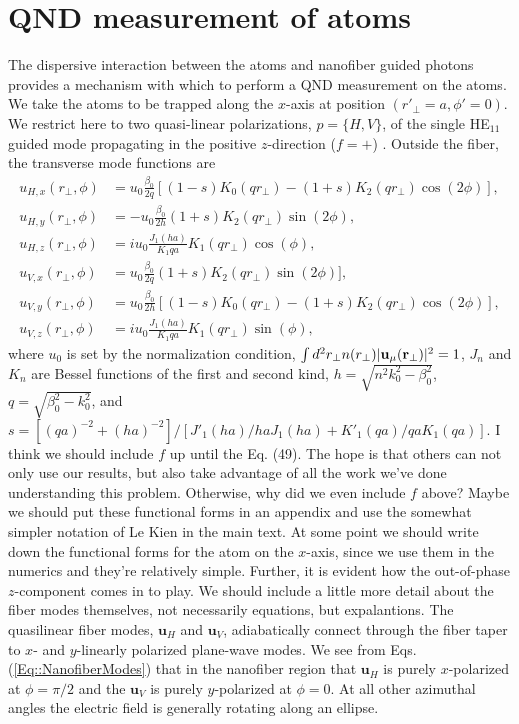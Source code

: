 \documentclass[preprint,aps,pra,onecolumn]{revtex4-1} %
\newcommand{\change}[1]{{\color{RoyalBlue} #1}}
\newcommand{\comment}[1]{{\color{Maroon} #1}}
\begin{document}
\section{QND measurement of atoms}
The dispersive interaction between the atoms and nanofiber guided photons provides a mechanism with which to perform a QND measurement on the atoms.  We take the atoms to be trapped along the $x$-axis at position $(r'_\perp =a, \phi' =0)$.  We restrict here to two quasi-linear polarizations, $p =\{H,V\}$, of the single HE$_{11}$ guided mode \comment{ propagating in the positive $z$-direction ($f = +$) }.  Outside the fiber, the transverse mode functions are~\cite{tong_single-mode_2004,kien_field_2004}
\comment{
\begin{subequations} \label{Eq::NanofiberModes}
\begin{align}
u_{H,x}(r_\perp,\phi) &= u_0 \frac{\beta_0}{2 q}[(1-s)K_0(q r_\perp) - (1+s)K_2(q r_\perp) \cos(2 \phi)], \\
u_{H,y}(r_\perp,\phi) &=-u_0 \frac{\beta_0}{2 h}  (1+s)K_2(q r_\perp) \sin(2 \phi) ,\\
u_{H,z}(r_\perp,\phi) &=iu_0 \frac{J_1(ha)}{K_1{qa}} K_1(q r_\perp) \cos(\phi), \\
u_{V,x}(r_\perp,\phi) &= u_0 \frac{\beta_0}{2 q}(1+s)K_2(q r_\perp) \sin(2 \phi)] ,\\
u_{V,y}(r_\perp,\phi) &=u_0 \frac{\beta_0}{2 h} [(1-s)K_0(q r_\perp) - (1+s)K_2(q r_\perp) \cos(2 \phi)], \\
u_{V,z}(r_\perp,\phi) &=iu_0 \frac{J_1(ha)}{K_1{qa}}K_1(q r_\perp) \sin(\phi), 
\end{align}
\end{subequations}
}
where $u_0$ is set by the normalization condition, $\int d^2 r_\perp n(r_\perp) | \mathbf{u}_\mu(\mathbf{r}_\perp)|^2=1$, $J_n$ and $K_n$ are Bessel functions of the first and second kind, $h=\sqrt{n^2 k_0^2 - \beta_0^2}$, $q=\sqrt{\beta_0^2- k_0^2}$, and $s = [(q a)^{-2} + (h a)^{-2}]/[J'_1(ha)/haJ_1(ha) + K'_1(qa)/qaK_1(qa)]$.  \comment{ I think we should include $f$ up until the Eq. (49).  The hope is that others can not only use our results, but also take advantage of all the work we've done understanding this problem.  Otherwise, why did we even include $f$ above?  Maybe we should put these functional forms in an appendix and use the somewhat simpler notation of Le Kien in the main text.  At some point we should write down the functional forms for the atom on the $x$-axis, since we use them in the numerics and they're relatively simple.  Further, it is evident how the out-of-phase $z$-component comes in to play.  We should include a little more detail about the fiber modes themselves, not necessarily equations, but expalantions.}  \change{The quasilinear fiber modes, $\mathbf{u}_H$ and $\mathbf{u}_V$, adiabatically connect through the fiber taper to $x$- and $y$-linearly polarized plane-wave modes.  We see from Eqs. (\ref{Eq::NanofiberModes}) that in the nanofiber region that $\mathbf{u}_H$ is purely $x$-polarized at $\phi = \pi/2$ and the  $\mathbf{u}_V$ is purely $y$-polarized at $\phi = 0$.  At all other azimuthal angles the electric field is generally rotating along an ellipse. }  
\end{document}
